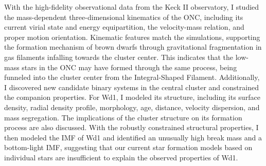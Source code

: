 \documentclass[12pt]{ucsddissertation}
\begin{document}
\begin{CJK*}{UTF8}{gbsn}
With the high-fidelity observational data from the Keck II observatory, I studied the mass-dependent three-dimensional kinematics of the ONC, including its current virial state and energy equipartition, the velocity-mass relation, and proper motion orientation. Kinematic features match the simulations, supporting the formation mechanism of brown dwarfs through gravitational fragmentation in gas filaments infalling towards the cluster center. This indicates that the low-mass stars in the ONC may have formed through the same process, being funneled into the cluster center from the Integral-Shaped Filament. Additionally, I discovered new candidate binary systems in the central cluster and constrained the companion properties. For Wd1, I modeled its structure, including its surface density, radial density profile, morphology, age, distance, velocity dispersion, and mass segregation. The implications of the cluster structure on its formation process are also discussed. With the robustly constrained structural properties, I then modeled the IMF of Wd1 and identified an unusually high break mass and a bottom-light IMF, suggesting that our current star formation models based on individual stars are insufficient to explain the observed properties of Wd1. 


\end{CJK*}
\end{document}
